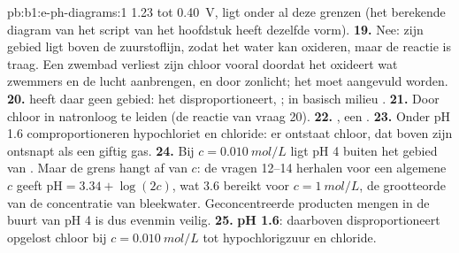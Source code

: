 \begin{solution}{pb:b1:e-ph-diagrams:1}
1.23 tot 0.40~V, ligt onder al deze grenzen (het berekende diagram van
het script van het hoofdstuk heeft dezelfde vorm).
\textbf{19.} Nee: zijn gebied ligt boven de zuurstoflijn, zodat het water
kan oxideren, maar de reactie is traag. Een zwembad verliest zijn chloor
vooral doordat het oxideert wat zwemmers en de lucht aanbrengen, en door
zonlicht; het moet aangevuld worden.
\textbf{20.}  heeft daar geen gebied: het disproportioneert,
; in basisch milieu
.
\textbf{21.} Door chloor in natronloog te leiden (de reactie van vraag
20).
\textbf{22.} , een .
\textbf{23.} Onder pH 1.6 comproportioneren hypochloriet en chloride: er
ontstaat chloor, dat boven zijn  ontsnapt als een giftig
gas.
\textbf{24.} Bij $c = \qty{0.010}{mol/L}$ ligt pH 4 buiten het gebied van
. Maar de grens hangt af van $c$: de vragen 12--14 herhalen voor
een algemene $c$ geeft $\mathrm{pH} = 3.34 + \log(2c)$, wat 3.6 bereikt
voor $c = \qty{1}{mol/L}$, de grootteorde van de concentratie van
bleekwater. Geconcentreerde producten mengen in de buurt van pH 4 is dus
evenmin veilig.
\textbf{25.} \textbf{pH 1.6}: daarboven disproportioneert opgelost chloor
bij $c = \qty{0.010}{mol/L}$ tot hypochlorigzuur en chloride.
\end{solution}
